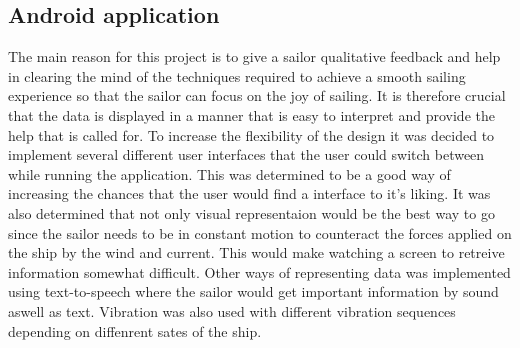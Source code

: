 \subsection{Android application}
The main reason for this project is to give a sailor qualitative feedback and help in clearing the mind of the techniques required to achieve a smooth sailing experience so that the sailor can focus on the joy of sailing. It is therefore crucial that the data is displayed in a manner that is easy to interpret and provide the help that is called for. To increase the flexibility of the design it was decided to implement several different user interfaces that the user could switch between while running the application. This was determined to be a good way of increasing the chances that the user would find a interface to it's liking. It was also determined that not only visual representaion would be the best way to go since the sailor needs to be in constant motion to counteract the forces applied on the ship by the wind and current. This would make watching a screen to retreive information somewhat difficult. Other ways of representing data was implemented using text-to-speech where the sailor would get important information by sound aswell as text. Vibration was also used with different vibration sequences depending on diffenrent sates of the ship.

